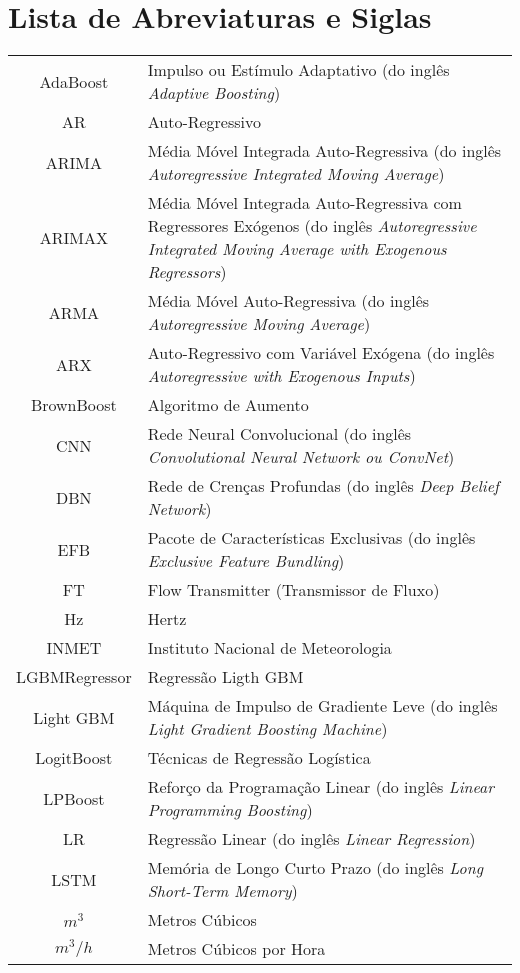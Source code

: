 \newpage
{}
\section*{Lista de Abreviaturas e Siglas}


\begin{tabular}{cp{}}
	AdaBoost & Impulso ou Estímulo Adaptativo (do inglês \textit{Adaptive Boosting}) \\
	AR & Auto-Regressivo\\
	ARIMA & Média Móvel Integrada Auto-Regressiva (do inglês \textit{Autoregressive Integrated Moving Average}) \\
	ARIMAX & Média Móvel Integrada Auto-Regressiva com Regressores Exógenos (do inglês \textit{Autoregressive Integrated Moving Average with Exogenous Regressors})\\
	ARMA & Média Móvel Auto-Regressiva (do inglês \textit{Autoregressive Moving Average}) \\
	ARX & Auto-Regressivo com Variável Exógena (do inglês \textit{Autoregressive with Exogenous Inputs})\\
	BrownBoost & Algoritmo de Aumento\\
	CNN & Rede Neural Convolucional (do inglês \textit{Convolutional Neural Network ou ConvNet})\\
	DBN & Rede de Crenças Profundas (do inglês \textit{Deep Belief Network}) \\
	EFB & Pacote de Características Exclusivas (do inglês \textit{Exclusive Feature Bundling})\\
	FT & Flow Transmitter (Transmissor de Fluxo)\\
	Hz & Hertz\\
	INMET & Instituto Nacional de Meteorologia\\
	LGBMRegressor & Regressão Ligth GBM\\
	Light GBM & Máquina de Impulso de Gradiente Leve (do inglês \textit{Light Gradient Boosting Machine}) \\
	LogitBoost & Técnicas de Regressão Logística\\
	LPBoost & Reforço da Programação Linear (do inglês \textit{Linear Programming Boosting}) \\
	LR & Regressão Linear (do inglês \textit{Linear Regression})\\
	LSTM & Memória de Longo Curto Prazo (do inglês \textit{Long Short-Term Memory})\\
	$m^3$ & Metros Cúbicos\\
	$m^3/h$ & Metros Cúbicos por Hora
\end{tabular}

